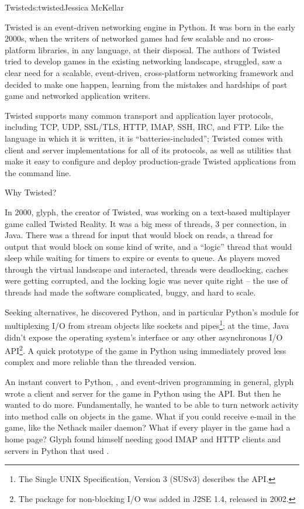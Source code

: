 \begin{aosachapter}{Twisted}{s:twisted}{Jessica McKellar}

Twisted is an event-driven networking engine in Python. It was born in the
early 2000s, when the writers of networked games had few scalable and no
cross-platform libraries, in any language, at their disposal. The authors of
Twisted tried to develop games in the existing networking landscape, struggled,
saw a clear need for a scalable, event-driven, cross-platform networking
framework and decided to make one happen, learning from the mistakes and
hardships of past game and networked application writers.

Twisted supports many common transport and application layer protocols,
including TCP, UDP, SSL/TLS, HTTP, IMAP, SSH, IRC, and FTP.  Like the language
in which it is written, it is ``batteries-included''; Twisted comes with client
and server implementations for all of its protocols, as well as utilities that
make it easy to configure and deploy production-grade Twisted applications from
the command line.

\begin{aosasect1}{Why Twisted?}

In 2000, glyph, the creator of Twisted, was working on a text-based
multiplayer game called Twisted Reality. It was a big mess of threads, 3 per
connection, in Java. There was a thread for input that would block on reads, a
thread for output that would block on some kind of write, and a ``logic'' thread
that would sleep while waiting for timers to expire or events to queue. As
players moved through the virtual landscape and interacted, threads were
deadlocking, caches were getting corrupted, and the locking logic was never
quite right -- the use of threads had made the software complicated, buggy, and
hard to scale.

Seeking alternatives, he discovered Python, and in particular Python's
 module for multiplexing I/O from stream objects like
sockets and pipes\footnote{The Single UNIX Specification, Version 3
  (SUSv3) describes the  API.}; at the time, Java didn't
expose the operating system's  interface or any other
asynchronous I/O API\footnote{The  package for
  non-blocking I/O was added in J2SE 1.4, released in 2002.}. A quick
prototype of the game in Python using  immediately proved
less complex and more reliable than the threaded version.

An instant convert to Python, , and event-driven
programming in general, glyph wrote a client and server for the game in Python
using the  API. But then he wanted to do more. Fundamentally,
he wanted to be able to turn network activity into method calls on objects in
the game. What if you could receive e-mail in the game, like the Nethack mailer
daemon? What if every player in the game had a home page? Glyph found himself
needing good IMAP and HTTP clients and servers in Python that used
.


\end{aosasect1}
\end{aosachapter}
